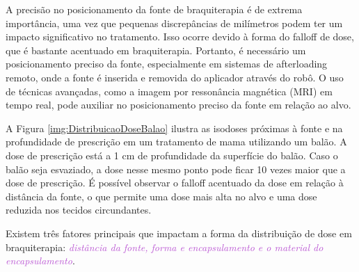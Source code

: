 \documentclass[11pt,a4paper]{article}
\begin{document}
	
	A precisão no posicionamento da fonte de braquiterapia é de extrema importância, uma vez que pequenas discrepâncias de milímetros podem ter um impacto significativo no tratamento. Isso ocorre devido à forma do falloff de dose, que é bastante acentuado em braquiterapia. Portanto, é necessário um posicionamento preciso da fonte, especialmente em sistemas de afterloading remoto, onde a fonte é inserida e removida do aplicador através do robô. O uso de técnicas avançadas, como a imagem por ressonância magnética (MRI) em tempo real, pode auxiliar no posicionamento preciso da fonte em relação ao alvo.
	
	A Figura \ref{img:DistribuicaoDoseBalao} ilustra as isodoses próximas à fonte e na profundidade de prescrição em um tratamento de mama utilizando um balão. A dose de prescrição está a 1 cm de profundidade da superfície do balão. Caso o balão seja esvaziado, a dose nesse mesmo ponto pode ficar 10 vezes maior que a dose de prescrição. É possível observar o falloff acentuado da dose em relação à distância da fonte, o que permite uma dose mais alta no alvo e uma dose reduzida nos tecidos circundantes.

		Existem três fatores principais que impactam a forma da distribuição de dose em braquiterapia:  \textit{\textcolor{MediumOrchid}{distância da fonte, forma e encapsulamento e o material do encapsulamento}}.
\end{document}
